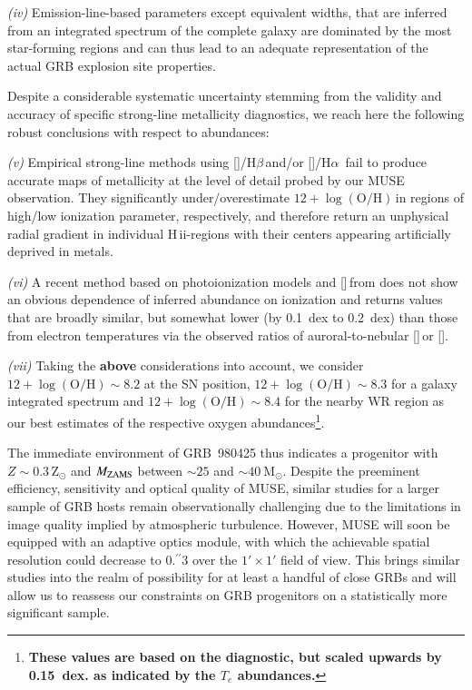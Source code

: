 \documentclass[traditabstract]{aa}
\newcommand{\farc}{\hbox{$.\!\!^{\prime\prime}$}}
\newcommand{\hb}{H$\beta$}
\newcommand{\ha}{H$\alpha$}
\newcommand{\hii}{\mbox{H\,{\sc ii}}}
\newcommand{\oh}{12+\log(\mathrm{O/H})}
\newcommand{\sii}{[\ion{S}{ii}]}
\newcommand{\siii}{[\ion{S}{iii}]}
\newcommand{\oiii}{[\ion{O}{iii}]}
\newcommand{\nii}{[\ion{N}{ii}]}
\begin{document}
\textit{(iv)} Emission-line-based parameters except equivalent widths, that are inferred from an integrated spectrum of the complete galaxy are dominated by the most star-forming regions and can thus lead to an adequate representation of the actual GRB explosion site properties.

Despite a considerable systematic uncertainty stemming from the validity and accuracy of specific strong-line metallicity diagnostics, we reach here the following robust conclusions with respect to abundances:

\textit{(v)} Empirical strong-line methods using \oiii/\hb\,and/or \nii/\ha\, fail to produce accurate maps of metallicity at the level of detail probed by our MUSE observation. They significantly under/overestimate $\oh$\,in regions of high/low ionization parameter, respectively, and therefore return an unphysical radial gradient in individual \hii-regions with their centers appearing artificially deprived in metals.

\textit{(vi)} A recent method based on photoionization models and \sii\,from \citet{2016Ap&SS.361...61D} does not show an obvious dependence of inferred abundance on ionization and returns values that are broadly similar, but somewhat lower (by 0.1~dex to 0.2~dex) than those from electron temperatures via the observed ratios of auroral-to-nebular \siii\,or \oiii. 

\textit{(vii)} Taking the \textbf{above} considerations into account, we consider $\oh\sim8.2$ at the SN position, $\oh\sim8.3$ for a galaxy integrated spectrum and $\oh\sim8.4$ for the nearby WR region as our best estimates of the respective oxygen abundances\footnote{\textbf{These values are based on the \citet{2016Ap&SS.361...61D} diagnostic, but scaled upwards by 0.15~dex. as indicated by the $T_e$ abundances.}}.

The immediate environment of GRB~980425 thus indicates a progenitor with $Z\sim0.3\,\mathrm{Z}_\odot$ and $M_{\rm{ZAMS}}$ between $\sim 25$ and $\sim40~\mathrm{M}_{\odot}$. Despite the preeminent efficiency, sensitivity and optical quality of MUSE, similar studies for a larger sample of GRB hosts remain observationally challenging due to the limitations in image quality implied by atmospheric turbulence. However, MUSE will soon be equipped with an adaptive optics module, with which the achievable spatial resolution could decrease to 0\farc{3} over the $1'\times1'$ field of view. This brings similar studies into the realm of possibility for at least a handful of close GRBs and will allow us to reassess our constraints on GRB progenitors on a statistically more significant sample.
\end{document}
